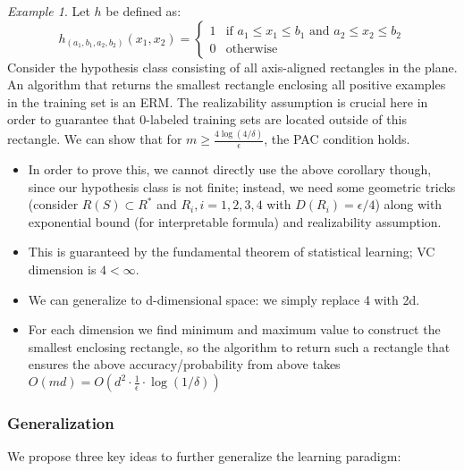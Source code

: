 \documentclass{article}
\theoremstyle{remark}
\newtheorem{example}{Example}
\begin{document}
\begin{example}
    Let \( h \) be defined as:
    \[
    h_{(a_1, b_1, a_2, b_2)}(x_1, x_2) = 
    \begin{cases} 
    1 & \text{if } a_1 \leq x_1 \leq b_1 \text{ and } a_2 \leq x_2 \leq b_2 \\
    0 & \text{otherwise}
    \end{cases}
    \]
    Consider the hypothesis class consisting of all axis-aligned rectangles in the plane.
    An algorithm that returns the smallest rectangle enclosing all positive examples in the training set is an ERM. 
    The realizability assumption is crucial here in order to guarantee that 0-labeled training sets are located outside of this rectangle. We can show that for $m\geq \frac{4\log(4/\delta)}\epsilon$, the PAC condition holds. 
    \begin{itemize}
    \item In order to prove this, we cannot directly use the above corollary though, since our hypothesis class is not finite;
        instead, we need some geometric tricks (consider $R(S)\subset R^*$ and $R_i, i=1,2,3,4$ with $D(R_i)=\epsilon/4$) along with exponential bound (for interpretable formula) and realizability assumption.
    \item This is guaranteed by the fundamental theorem of statistical learning; VC dimension is $4<\infty$.
    \item We can generalize to d-dimensional space: we simply replace 4 with 2d.
    \item For each dimension we find minimum and maximum value to construct the smallest enclosing rectangle, so the algorithm to return such a rectangle that ensures the above accuracy/probability 
    from above takes $O(md)=O(d^2\cdot\frac 1\epsilon\cdot \log(1/\delta))$
    \end{itemize}
\end{example}
    \subsubsection*{Generalization}

    We propose three key ideas to further generalize the learning paradigm:
    
\end{document}
